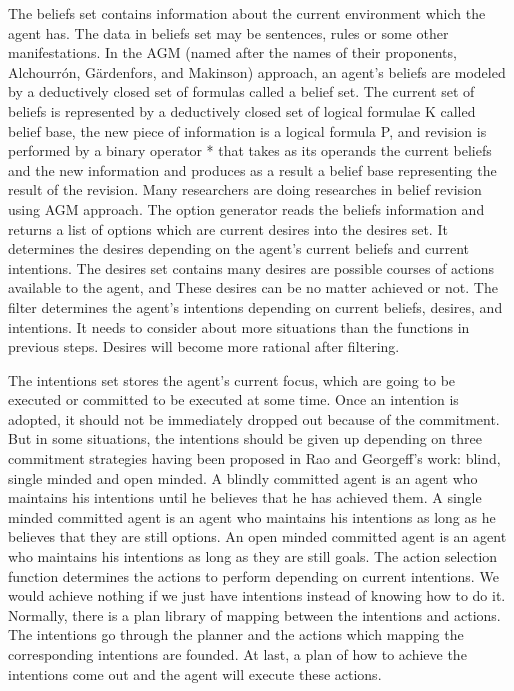 The beliefs set contains information about the current environment which the agent has. The data in beliefs set may be sentences, rules or some other manifestations. In the AGM (named after the names of their proponents, Alchourrón, Gärdenfors, and Makinson)\cite{alchourron_revision_1985} approach, an agent’s beliefs are modeled by a deductively closed set of formulas called a belief set\cite{James_revise_2011}.
The current set of beliefs is represented by a deductively closed set of logical formulae K called belief base, the new piece of information is a logical formula P, and revision is performed by a binary operator * that takes as its operands the current beliefs and the new information and produces as a result a belief base representing the result of the revision\cite{M_Belief}. Many researchers are doing researches in belief revision using AGM approach.
The option generator reads the beliefs information and returns a list of options which are current desires into the desires set. It determines the desires depending on the agent’s current beliefs and current intentions. The desires set contains many desires are possible courses of actions available to the agent, and These desires can be no matter achieved or not. The filter determines the agent’s intentions depending on current beliefs, desires, and intentions. It needs to consider about more situations than the functions in previous steps. Desires will become more rational after filtering.

The intentions set stores the agent’s current focus, which are going to be executed or committed to be executed at some time. Once an intention is adopted, it should not be immediately dropped out because of the commitment. But in some situations, the intentions should be given up depending on  three commitment strategies having been proposed in Rao and Georgeff’s work:  blind, single minded and open minded. A blindly committed agent is an agent who maintains his intentions until he believes that he has achieved them. A single minded committed agent is an agent who maintains his intentions as long as he believes that they are still options. An open minded committed agent is an agent who maintains his intentions as long as they are still goals\cite{Roberto_BDIATL_2005}. The action selection function determines the actions to perform depending on current intentions. We would achieve nothing if we just have intentions instead of knowing how to do it. Normally, there is a plan library of mapping between the intentions and actions. The intentions go through the planner and the actions which mapping the corresponding intentions are founded. At last, a plan of how to achieve the intentions come out and the agent will execute these actions.

